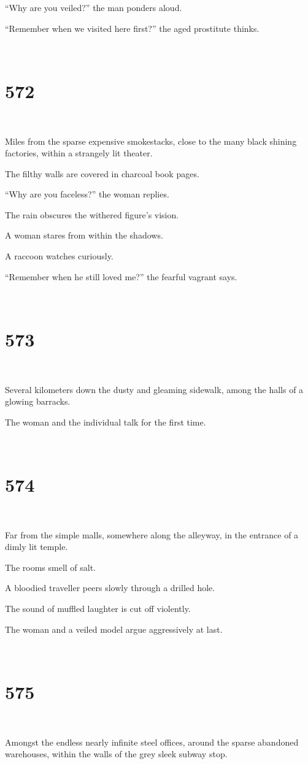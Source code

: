 \documentclass{report}
\begin{document}
``Why are you veiled?'' the man ponders aloud.

``Remember when we visited here first?'' the aged prostitute thinks.

~
\chapter*{572}
~

Miles from the sparse expensive smokestacks, close to the many black shining factories, within a strangely lit theater.

The filthy walls are covered in charcoal book pages.

``Why are you faceless?'' the woman replies.

The rain obscures the withered figure's vision.

A woman stares from within the shadows.

A raccoon watches curiously.

``Remember when he still loved me?'' the fearful vagrant says.

~
\chapter*{573}
~

Several kilometers down the dusty and gleaming sidewalk, among the halls of a glowing barracks.

The woman and the individual talk for the first time.

~
\chapter*{574}
~

Far from the simple malls, somewhere along the alleyway, in the entrance of a dimly lit temple.

The rooms smell of salt.

A bloodied traveller peers slowly through a drilled hole.

The sound of muffled laughter is cut off violently.

The woman and a veiled model argue aggressively at last.

~
\chapter*{575}
~

Amongst the endless nearly infinite steel offices, around the sparse abandoned warehouses, within the walls of the grey sleek subway stop.
\end{document}
